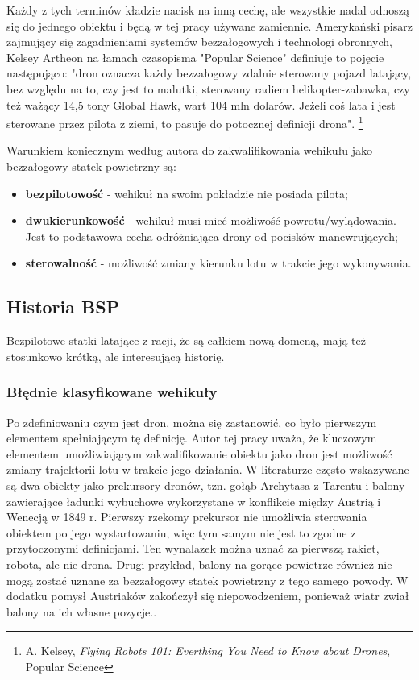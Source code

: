 Każdy z tych terminów kładzie nacisk na inną cechę, ale wszystkie nadal odnoszą się do jednego obiektu i będą w tej pracy używane zamiennie. Amerykański pisarz zajmujący się zagadnieniami systemów bezzałogowych i technologi obronnych,  Kelsey Artheon na łamach czasopisma "Popular Science" definiuje to pojęcie następująco: "dron oznacza każdy bezzałogowy zdalnie sterowany pojazd latający, bez względu na to, czy jest to malutki, sterowany radiem helikopter-zabawka, czy też ważący 14,5 tony Global Hawk, wart 104 mln dolarów. Jeżeli coś lata i jest sterowane przez pilota z ziemi, to pasuje do potocznej definicji drona". \footnote{A. Kelsey, \textit{Flying Robots 101: Everthing You Need to Know about Drones}, Popular Science\cite{arton-kelsey}} \cite{dron-ibuk} 

\hspace{1cm}Warunkiem koniecznym według autora do zakwalifikowania wehikułu jako bezzałogowy statek powietrzny są:
\begin{itemize}
  \item \textbf{bezpilotowość} - wehikuł na swoim pokładzie nie posiada pilota;
  \item \textbf{dwukierunkowość} - wehikuł musi mieć możliwość powrotu/wylądowania. Jest to podstawowa cecha odróżniająca drony od pocisków manewrujących; 
  \item  \textbf{sterowalność} - możliwość zmiany kierunku lotu w trakcie jego wykonywania.
\end{itemize}

\subsection{Historia BSP}
\hspace{1cm}Bezpilotowe statki latające z racji, że są całkiem nową domeną, mają też stosunkowo krótką, ale interesującą historię.

\subsubsection{Błędnie klasyfikowane wehikuły}
\hspace{1cm}Po zdefiniowaniu czym jest dron, można się zastanowić, co było pierwszym elementem spełniającym tę definicję. Autor tej pracy uważa, że kluczowym elementem umożliwiającym zakwalifikowanie obiektu jako dron jest możliwość zmiany trajektorii lotu w trakcie jego działania. W literaturze często wskazywane są dwa obiekty jako prekursory dronów, tzn. gołąb Archytasa z Tarentu i balony zawierające ładunki wybuchowe wykorzystane w konflikcie między Austrią i Wenecją w 1849 r. Pierwszy rzekomy prekursor nie umożliwia sterowania obiektem po jego wystartowaniu, więc tym samym nie jest to zgodne z przytoczonymi definicjami. Ten wynalazek można uznać za pierwszą rakiet, robota, ale nie drona. Drugi przykład, balony na gorące powietrze również nie mogą zostać uznane za bezzałogowy statek powietrzny z tego samego powody. W dodatku pomysł Austriaków zakończył się niepowodzeniem, ponieważ wiatr zwiał balony na ich własne pozycje.\cite{dron-ibuk}. 


